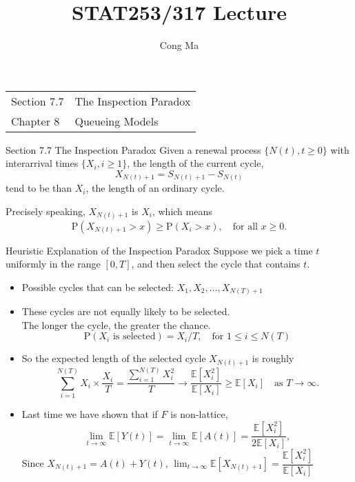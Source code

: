 \documentclass[letterpaper,handout, mathserif]{beamer}
\title{STAT253/317 Lecture \chapnum}\date{} \author{Cong Ma}
\def\p{\mathrm P}
\def\E{\mathbb E}
\begin{document}
\begin{frame}
\maketitle
\begin{center}\large
\begin{tabular}{ll}
Section 7.7 & The Inspection Paradox\\
Chapter 8   & Queueing Models
\end{tabular}
\end{center}
\end{frame}
\begin{frame}{Section 7.7 The Inspection Paradox}
Given a renewal process $\{N(t),t\ge 0\}$ with interarrival times
$\{X_i, i\ge 1\}$, the length of the current cycle, $$X_{N(t)+1}=S_{N(t)+1}-S_{N(t)}$$
tend to be  than $X_i$, the length of an ordinary cycle. \bigskip

Precisely speaking, $X_{N(t)+1}$ is  $X_i$, which means
$$\p(X_{N(t)+1}>x)\ge \p(X_{i}>x), \quad\mbox{for all }x\ge 0.$$
\end{frame}
\begin{frame}{Heuristic Explanation of the Inspection Paradox}
Suppose we pick a time $t$ uniformly in the range $[0,T]$, and then select the cycle that contains $t$.
\begin{itemize}
\item Possible cycles that can be selected: $X_1, X_2,\ldots,X_{N(T)+1}$
\item These cycles are not equally likely to be selected.\\
The longer the cycle, the greater the chance.
$$
\p(\mbox{$X_i$ is selected})= X_i/T,\quad \mbox{for }1\le i\le N(T)
$$
\item So the expected length of the selected cycle $X_{N(t)+1}$ is roughly
$$
\sum_{i=1}^{N(T)}X_i\times \frac{X_i}{T}
=\frac{\sum_{i=1}^{N(T)}X_i^2}{T}\to\frac{\E[X_i^2]}{\E[X_i]}\ge \E[X_i]\quad\mbox{as }T\to\infty.
$$
\item Last time we have shown that if $F$ is non-lattice,
$$\lim_{t\to\infty}\E[Y(t)]=\lim_{t\to\infty}\E[A(t)]=\frac{\E[X_i^2]}{2\E[X_i]},$$
Since $X_{N(t)+1}=A(t)+Y(t)$,  $\lim_{t\to\infty}\E[X_{N(t)+1}]=\dfrac{\E[X_i^2]}{\E[X_i]}$
\end{itemize}
\end{frame}
\end{document}
